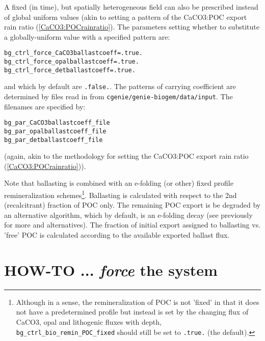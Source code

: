 \documentclass[11pt,fleqn]{book} %
\begin{document}
A fixed (in time), but spatially heterogeneous field can also be prescribed instead of global uniform values (akin to setting a pattern of the CaCO3:POC export rain ratio (\ref{CaCO3:POCrainratio}). The parameters setting whether to substitute a globally-uniform value with a specified pattern are:
\vspace{-2pt}\begin{verbatim}
bg_ctrl_force_CaCO3ballastcoeff=.true.
bg_ctrl_force_opalballastcoeff=.true.
bg_ctrl_force_detballastcoeff=.true.
\end{verbatim}\vspace{-2pt}
and which by default are \texttt{.false.}.
The patterns of carrying coefficient are determined by files read in from \texttt{cgenie\slash genie-biogem\slash data\slash input}. The filenames are specified by:
\vspace{-2pt}\begin{verbatim}
bg_par_CaCO3ballastcoeff_file
bg_par_opalballastcoeff_file
bg_par_detballastcoeff_file
\end{verbatim}\vspace{-2pt}
(again, akin to the methodology for setting the CaCO3:POC export rain ratio (\ref{CaCO3:POCrainratio})).

Note that ballasting is combined with an e-folding (or other) fixed profile remineralization schemes\footnote{Although in a sense, the remineralization of POC is not 'fixed' in that it does not have a predetermined profile but instead is set by the changing flux of CaCO3, opal and lithogenic fluxes with depth, \texttt{bg\_ctrl\_bio\_remin\_POC\_fixed} should still be set to \texttt{.true.} (the default).}. Ballasting is calculated with respect to the 2nd (recalcitrant) fraction of POC only. The remaining POC export is be degraded by an alternative algorithm, which by default, is an e-folding decay (see previously for more and alternatives). The fraction of initial export assigned to ballasting vs. 'free' POC is calculated according to the available exported ballast flux.


\newpage


\section{HOW-TO ...  \textit{force} the system}

%
\end{document}
